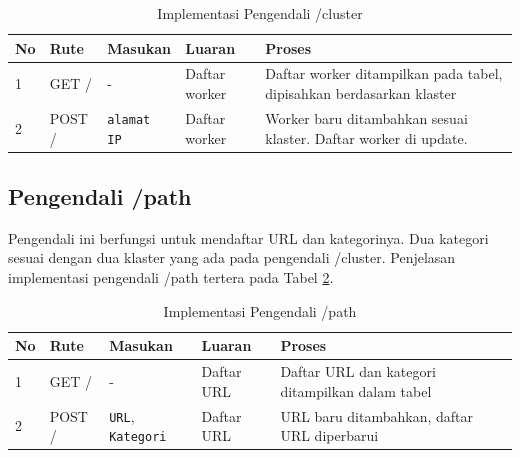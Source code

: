 \documentclass{ta-its}
\begin{document}
				\begin{longtable}{|p{}|p{}|p{}|p{}|p{}|} %
					
					\caption{Implementasi Pengendali /cluster} \label{tabelPengendaliCluster} \\
					\hline
					\textbf{No} & \textbf{Rute} & \textbf{Masukan} & \textbf{Luaran} & \textbf{Proses} \\ \hline
					
					\endhead
					\endfoot
					\endlastfoot
					
					1 & GET / & - & Daftar worker &  Daftar worker ditampilkan pada tabel, dipisahkan berdasarkan klaster\\ \hline
					2 & POST / & \texttt{alamat IP} & Daftar worker & Worker baru ditambahkan sesuai klaster. Daftar worker di update. \\ \hline				
					
				\end{longtable}
			
			\subsection{Pengendali /path}
				Pengendali ini berfungsi untuk mendaftar URL dan kategorinya. Dua kategori sesuai dengan dua klaster yang ada pada pengendali /cluster. Penjelasan implementasi pengendali /path tertera pada Tabel \ref{tabelPengendaliPath}.
				
				\begin{longtable}{|p{}|p{}|p{}|p{}|p{}|} %
					
					\caption{Implementasi Pengendali /path} \label{tabelPengendaliPath} \\
					\hline
					\textbf{No} & \textbf{Rute} & \textbf{Masukan} & \textbf{Luaran} & \textbf{Proses} \\ \hline
					
					\endhead
					\endfoot
					\endlastfoot
					
					1 & GET / & - & Daftar URL &  Daftar URL dan kategori ditampilkan dalam tabel \\ \hline
					2 & POST / & \texttt{URL}, \texttt{Kategori} & Daftar URL & URL baru ditambahkan, daftar URL diperbarui \\ \hline				
					
				\end{longtable}
	
\end{document}
